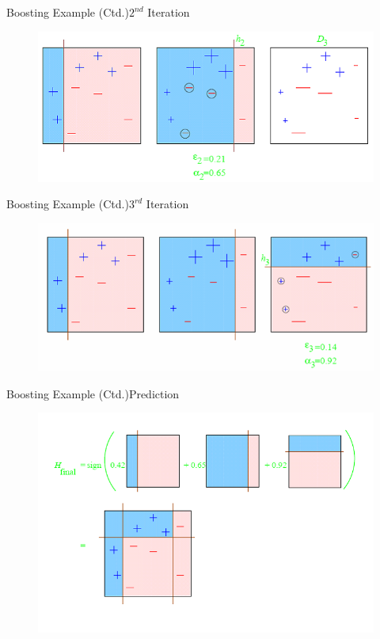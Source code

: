 \begin{frame}{Boosting Example (Ctd.)}{$2^{nd}$ Iteration}
	\begin{figure}
		\includegraphics[scale=0.60]{08_decision_trees/02_img/boosting_second_iteration}
	\end{figure}
\end{frame}


\begin{frame}{Boosting Example (Ctd.)}{$3^{rd}$ Iteration}
	\begin{figure}
		\includegraphics[scale=0.60]{08_decision_trees/02_img/boosting_third_iteration}
	\end{figure}
\end{frame}


\begin{frame}{Boosting Example (Ctd.)}{Prediction}
	\vspace*{-2mm}
	\begin{figure}
		\includegraphics[scale=0.45]{08_decision_trees/02_img/boosting_prediction}
	\end{figure}
\end{frame}


